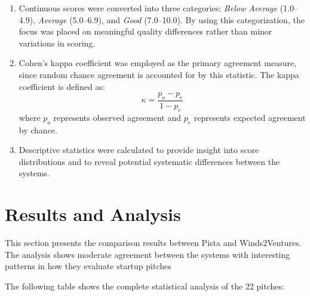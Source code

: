 \begin{enumerate}
    \item Continuous scores were converted into three categories: 
    \textit{Below Average} (1.0--4.9), \textit{Average} (5.0--6.9), 
    and \textit{Good} (7.0--10.0). By using this categorization, 
    the focus was placed on meaningful quality differences rather than minor variations in scoring.

    \item Cohen's kappa coefficient was employed as the primary 
    agreement measure, since random chance agreement is accounted for by 
    this statistic. The kappa coefficient is defined as:
    \[
    \kappa = \frac{p_o - p_e}{1 - p_e}
    \]
    where $p_o$ represents observed agreement and $p_e$ represents 
    expected agreement by chance.

    \item Descriptive statistics were calculated to provide insight into score distributions and to reveal potential systematic differences  between the systems.
\end{enumerate}


\section{Results and Analysis}
\label{sec:inter-rater-reliability}

This section presents the comparison results between Pista and Winds2Ventures. The analysis shows moderate agreement between the systems with interesting patterns in how they evaluate startup pitches

The following table shows the complete statistical analysis of the 22 pitches:

